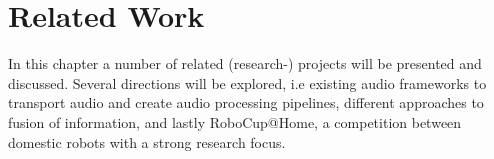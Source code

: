 
\chapter{Related Work}

In this chapter a number of related (research-) projects will be presented and discussed. 
Several directions will be explored, i.e existing audio frameworks to transport audio and create audio processing pipelines, different approaches to fusion of information, and lastly RoboCup@Home, a competition between domestic robots with a strong research focus.



